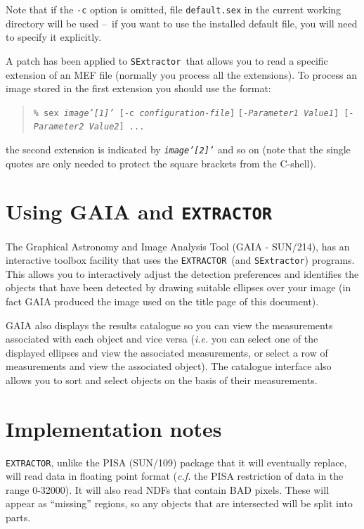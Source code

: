 \documentclass[twoside,11pt]{article}
\newcommand{\xref}[3]{#1}
\newcommand{\xlabel}[1]{}
\renewcommand{\_}{\texttt{\symbol{95}}}
\newcommand{\EXTRACTOR}{\texttt{EXTRACTOR}}
\newcommand{\SExtractor}{\texttt{SExtractor}}
\newcommand{\dash}{--}
\newcommand{\dash}{-}
\begin{document}
Note that if the \texttt{-c} option is omitted, file
\texttt{default.sex} in the current working directory will be used
\dash\ if you want to use the installed default file, you will need to
specify it explicitly.

A patch has been applied to \SExtractor\ that allows you to read a specific
extension of an MEF file (normally you process all the extensions).
To process an image stored in the first extension you should use the format:
\begin{quote}
\texttt{\% sex \textit{image'[1]'} [-c \textit{configuration-file}]}
\texttt{[-\textit{Parameter1 Value1}] [-\textit{Parameter2 Value2}] ...}
\end{quote}
the second extension is indicated by \texttt{\textit{image'[2]'}} and
so on (note that the single quotes are only needed to protect the square
brackets from the C-shell).

\section{\xlabel{using_gaia_and_extractor}Using GAIA and \EXTRACTOR}
The Graphical Astronomy and Image Analysis Tool (GAIA -
\xref{SUN/214}{sun214}{}), has an interactive toolbox facility that
uses the \EXTRACTOR\ (and \SExtractor) programs. This allows you to
interactively adjust the detection preferences and identifies the
objects that have been detected by drawing suitable ellipses over your
image (in fact GAIA produced the image used on the title page of this
document).

GAIA also displays the results catalogue so you can view the
measurements associated with each object and vice versa (\textit{i.e.}
you can select one of the displayed ellipses and view the associated
measurements, or select a row of measurements and view the associated
object). The catalogue interface also allows you to sort and select
objects on the basis of their measurements.

\section{\label{implementation_notes}\xlabel{implementation_notes}Implementation notes}

\EXTRACTOR, unlike the PISA (\xref{SUN/109}{sun109}{}) package that it
will eventually replace, will read data in floating point format
(\textit{c.f.} the PISA restriction of data in the range 0-32000).  It will
also read NDFs that contain BAD pixels. These will appear as
``missing'' regions, so any objects that are intersected will be split
into parts.
\end{document}
